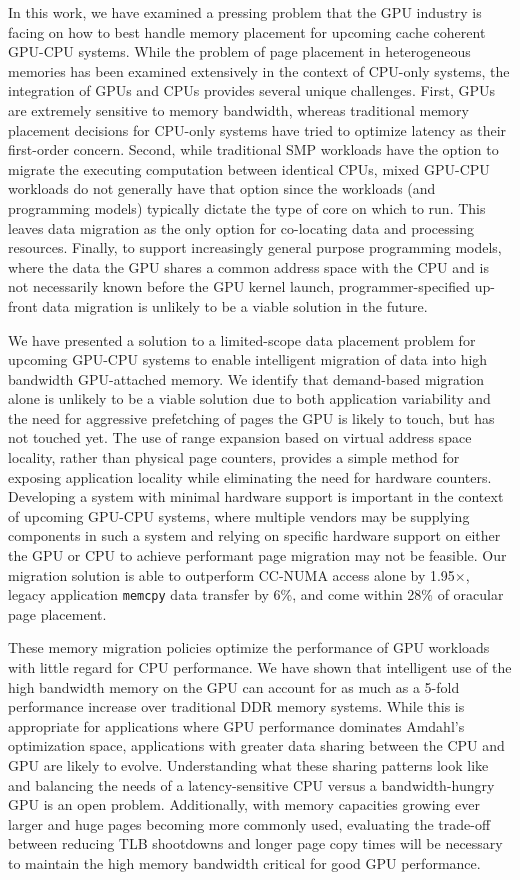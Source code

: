 
In this work, we have examined a pressing problem that the GPU industry is facing on how to best
handle memory placement for upcoming cache coherent GPU-CPU systems.  While the problem of page
placement in heterogeneous memories has been examined extensively in the context of CPU-only systems,
the integration of GPUs
and CPUs provides several unique challenges.  First, GPUs are extremely sensitive to memory
bandwidth, whereas traditional memory placement decisions for CPU-only systems have tried to optimize
latency as their first-order concern.  Second, while traditional SMP workloads have the option
to migrate the executing computation between identical CPUs, mixed GPU-CPU workloads do not generally have
that option since the workloads (and programming models) typically dictate the type of core on which to run.
This leaves data migration as the only option for co-locating data and processing resources.
Finally, to support increasingly general purpose programming models, where the data the GPU shares a 
common address space with the CPU and is not necessarily known before the GPU kernel launch, 
programmer-specified up-front data migration is unlikely to be a viable solution in the future.

We have presented a solution to a limited-scope data placement problem for upcoming GPU-CPU systems
to enable intelligent migration of data into high bandwidth GPU-attached memory.  
We identify that demand-based migration alone is unlikely
to be a viable solution due to both application variability and the need for aggressive prefetching of 
pages the GPU is likely to touch, but has not touched yet.  The use of range expansion based on virtual 
address space locality, rather than physical page counters, provides a simple method for exposing 
application locality while eliminating the need for hardware counters.  Developing a system with 
minimal hardware support is important in the context of upcoming GPU-CPU systems, where multiple 
vendors may be supplying components in such a system and relying on specific hardware support on either 
the GPU or CPU to achieve performant page migration may not be feasible.  Our migration solution
is able to outperform CC-NUMA access alone by 1.95$\times$, legacy
application {\tt memcpy} data transfer by 6\%, and come within 28\% of oracular page placement.

These memory migration policies optimize the performance of GPU workloads with little regard for CPU
performance.  We have
shown that intelligent use of the high bandwidth memory on the GPU can account for as much as a 5-fold performance
increase over traditional DDR memory systems.
While this is appropriate for applications where GPU performance dominates Amdahl's optimization
space, applications with greater data sharing between the CPU and GPU are likely to evolve. 
{\color{black}Understanding
what these sharing patterns look like and balancing the needs of a latency-sensitive CPU
versus a bandwidth-hungry GPU is an open problem. Additionally, with memory capacities growing ever larger and huge pages becoming
more commonly used, evaluating the trade-off between reducing TLB shootdowns and longer page copy
times will be necessary to maintain the high memory bandwidth critical for good GPU performance.}
